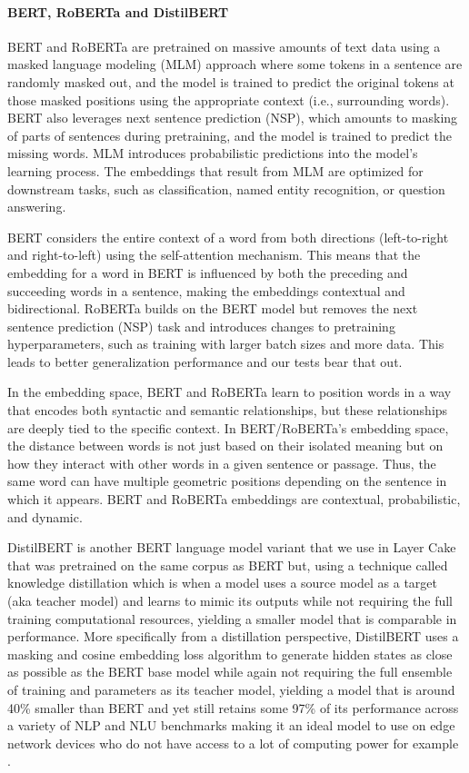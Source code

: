 \documentclass[final]{clv2025}
\begin{document}
\paragraph{BERT, RoBERTa and DistilBERT} 

BERT \cite{devlin-etal-2019-bert} and RoBERTa \cite{liu2019roberta} are pretrained on massive amounts of text data using a masked language modeling (MLM) approach where some tokens in a sentence are randomly masked out, and the model is trained to predict the original tokens at those masked positions using the appropriate context (i.e., surrounding words). BERT also leverages next sentence prediction (NSP), which amounts to masking of parts of sentences during pretraining, and the model is trained to predict the missing words. MLM introduces probabilistic predictions into the model’s learning process. The embeddings that result from MLM are optimized for downstream tasks, such as classification, named entity recognition, or question answering. 

BERT considers the entire context of a word from both directions (left-to-right and right-to-left) using the self-attention mechanism. This means that the embedding for a word in BERT is influenced by both the preceding and succeeding words in a sentence, making the embeddings contextual and bidirectional. RoBERTa builds on the BERT model but removes the next sentence prediction (NSP) task and introduces changes to pretraining hyperparameters, such as training with larger batch sizes and more data. This leads to better generalization performance and our tests bear that out. 

In the embedding space, BERT and RoBERTa learn to position words in a way that encodes both syntactic and semantic relationships, but these relationships are deeply tied to the specific context. In BERT/RoBERTa's embedding space, the distance between words is not just based on their isolated meaning but on how they interact with other words in a given sentence or passage. Thus, the same word can have multiple geometric positions depending on the sentence in which it appears. BERT and RoBERTa embeddings are contextual, probabilistic, and dynamic.

DistilBERT is another BERT language model variant that we use in Layer Cake that was pretrained on the same corpus as BERT but, using a technique called knowledge distillation \cite{hinton2015distilling} which is when a model uses a source model as a target (aka teacher model) and learns to mimic its outputs while not requiring the full training computational resources, yielding a smaller model that is comparable in performance. More specifically from a distillation perspective, DistilBERT uses a masking and cosine embedding loss algorithm to generate hidden states as close as possible as the BERT base model while again not requiring the full ensemble of training and parameters as its teacher model, yielding a model that is around 40\% smaller than BERT and yet still retains some 97\% of its performance across a variety of NLP and NLU benchmarks making it an ideal model to use on edge network devices who do not have access to a lot of computing power for example \cite{sanh2020distilbert}.
\end{document}
